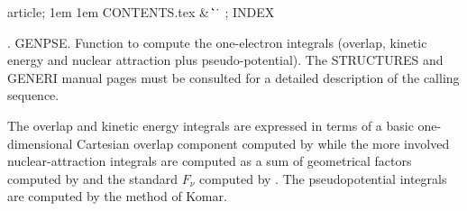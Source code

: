 


\Wbegin[;]
{article;}
{1em}
{1em}
{CONTENTS.tex}
{ %
 {\&\WRS}
 {\|}
 {\>\WUC}
 {\>\WUC}
 {\>\WUC}
 {\@}
 {\.\.}
 {\.}
 {}
}
{\M}
{;}
{INDEX}



\def\title{---PSEUDOPOTENTIAL INTEGRALS---}




\FWEBtoc

.  GENPSE. Function to compute the one-electron integrals (overlap,
kinetic energy and nuclear attraction plus pseudo-potential).
The STRUCTURES and GENERI manual pages must be
consulted for a detailed description of the calling sequence.

The overlap and kinetic energy integrals are expressed in terms of
a basic one-dimensional Cartesian overlap component computed by
 while the more involved nuclear-attraction
integrals are computed as a sum of geometrical factors computed by
 and the standard $F_\nu$ computed by .
The pseudopotential integrals are computed by the method of Komar.

